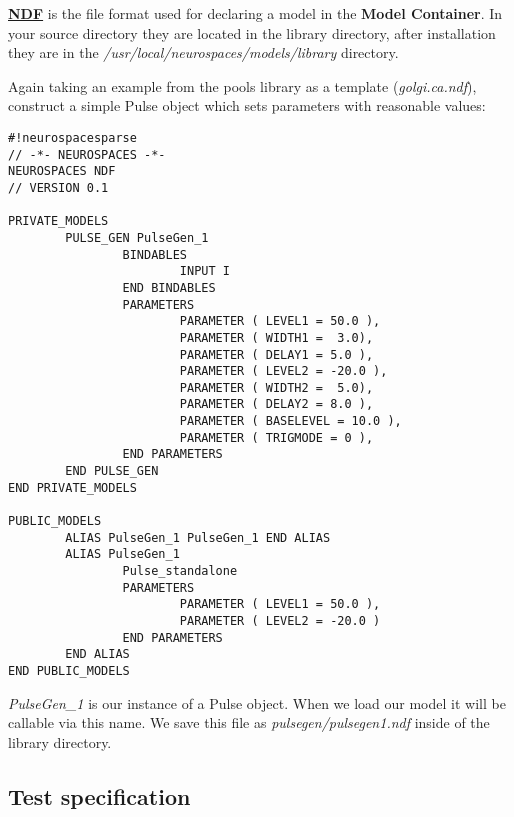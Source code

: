 \documentclass[12pt]{article}
\begin{document}
\href{../ndf-file-format/ndf-file-format.tex}{\bf NDF} is the file format used for declaring a model in the {\bf Model Container}. In your source directory they are located in the library directory, after installation they are in the {\it /usr/local/neurospaces/models/library} directory.

Again taking an example from the pools library as a template ({\it golgi.ca.ndf}), construct a simple Pulse object which sets parameters with reasonable values:
\begin{verbatim}
#!neurospacesparse
// -*- NEUROSPACES -*-
NEUROSPACES NDF
// VERSION 0.1

PRIVATE_MODELS
        PULSE_GEN PulseGen_1
                BINDABLES
                        INPUT I
                END BINDABLES
                PARAMETERS
                        PARAMETER ( LEVEL1 = 50.0 ),
                        PARAMETER ( WIDTH1 =  3.0),
                        PARAMETER ( DELAY1 = 5.0 ),
                        PARAMETER ( LEVEL2 = -20.0 ),
                        PARAMETER ( WIDTH2 =  5.0),
                        PARAMETER ( DELAY2 = 8.0 ),
                        PARAMETER ( BASELEVEL = 10.0 ),
                        PARAMETER ( TRIGMODE = 0 ),
                END PARAMETERS
        END PULSE_GEN
END PRIVATE_MODELS

PUBLIC_MODELS
        ALIAS PulseGen_1 PulseGen_1 END ALIAS
        ALIAS PulseGen_1 
                Pulse_standalone
                PARAMETERS
                        PARAMETER ( LEVEL1 = 50.0 ),
                        PARAMETER ( LEVEL2 = -20.0 )
                END PARAMETERS
        END ALIAS
END PUBLIC_MODELS
\end{verbatim}
{\it PulseGen\_1} is our instance of a Pulse object. When we load our model it will be callable via this name. We save this file as {\it pulsegen/pulsegen1.ndf} inside of the library directory.

\subsection*{Test specification}
\end{document}
